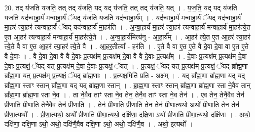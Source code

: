 \documentclass[17pt]{extarticle}
\begin{document}
20. तद् य॑जति यजति॒ तत् तद् य॑जति॒ यद् यद् य॑जति॒ तत् तद् य॑जति॒ यत् । . य॒ज॒ति॒ यद् यद् य॑जति यजति॒ यद॑न्वाहा॒र्य॑ मन्वाहा॒र्यं॑ ॅयद् य॑जति यजति॒ यद॑न्वाहा॒र्य᳚म् । . यद॑न्वाहा॒र्य॑ मन्वाहा॒र्यं॑ ॅयद् यद॑न्वाहा॒र्य॑ मा॒हर॑ त्या॒हर॑ त्यन्वाहा॒र्यं॑ ॅयद् यद॑न्वाहा॒र्य॑ मा॒हर॑ति । . अ॒न्वा॒हा॒र्य॑ मा॒हर॑ त्या॒हर॑ त्यन्वाहा॒र्य॑ मन्वाहा॒र्य॑ मा॒हर॑त्ये॒त ए॒त आ॒हर॑ त्यन्वाहा॒र्य॑ मन्वाहा॒र्य॑ मा॒हर॑त्ये॒ते । . अ॒न्वा॒हा॒र्य॑मित्य॑नु - आ॒हा॒र्य᳚म् । . आ॒हर॑ त्ये॒त ए॒त आ॒हर॑ त्या॒हर॑ त्ये॒ते वै वा ए॒त आ॒हर॑ त्या॒हर॑ त्ये॒ते वै । . आ॒हर॒तीत्या᳚ - हर॑ति । . ए॒ते वै वा ए॒त ए॒ते वै दे॒वा दे॒वा वा ए॒त ए॒ते वै दे॒वाः । . वै दे॒वा दे॒वा वै वै दे॒वाः प्र॒त्यक्ष॑म् प्र॒त्यक्ष॑म् दे॒वा वै वै दे॒वाः प्र॒त्यक्ष᳚म् । . दे॒वाः प्र॒त्यक्ष॑म् प्र॒त्यक्ष॑म् दे॒वा दे॒वाः प्र॒त्यक्षं॒ ॅयद् यत् प्र॒त्यक्ष॑म् दे॒वा दे॒वाः प्र॒त्यक्षं॒ ॅयत् । . प्र॒त्यक्षं॒ ॅयद् यत् प्र॒त्यक्ष॑म् प्र॒त्यक्षं॒ ॅयद् ब्रा᳚ह्म॒णा ब्रा᳚ह्म॒णा यत् प्र॒त्यक्ष॑म् प्र॒त्यक्षं॒ ॅयद् ब्रा᳚ह्म॒णाः । . प्र॒त्यक्ष॒मिति॑ प्रति - अक्ष᳚म् । . यद् ब्रा᳚ह्म॒णा ब्रा᳚ह्म॒णा यद् यद् ब्रा᳚ह्म॒णा स्ताꣳ स्तान् ब्रा᳚ह्म॒णा यद् यद् ब्रा᳚ह्म॒णा स्तान् । . ब्रा॒ह्म॒णा स्ताꣳ स्तान् ब्रा᳚ह्म॒णा ब्रा᳚ह्म॒णा स्ता ने॒वैव तान् ब्रा᳚ह्म॒णा ब्रा᳚ह्म॒णा स्ता ने॒व । . ता ने॒वैव ताꣳ स्ता ने॒व तेन॒ तेनै॒व ताꣳ स्ता ने॒व तेन॑ । . ए॒व तेन॒ तेनै॒वैव तेन॑ प्रीणाति प्रीणाति॒ तेनै॒वैव तेन॑ प्रीणाति । . तेन॑ प्रीणाति प्रीणाति॒ तेन॒ तेन॑ प्रीणा॒त्यथो॒ अथो᳚ प्रीणाति॒ तेन॒ तेन॑ प्रीणा॒त्यथो᳚ । . प्री॒णा॒त्यथो॒ अथो᳚ प्रीणाति प्रीणा॒त्यथो॒ दक्षि॑णा॒ दक्षि॒णा ऽथो᳚ प्रीणाति प्रीणा॒त्यथो॒ दक्षि॑णा । . अथो॒ दक्षि॑णा॒ दक्षि॒णा ऽथो॒ अथो॒ दक्षि॑णै॒वैव दक्षि॒णा ऽथो॒ अथो॒ दक्षि॑णै॒व । . अथो॒ इत्यथो᳚ । \newline
\end{document}
